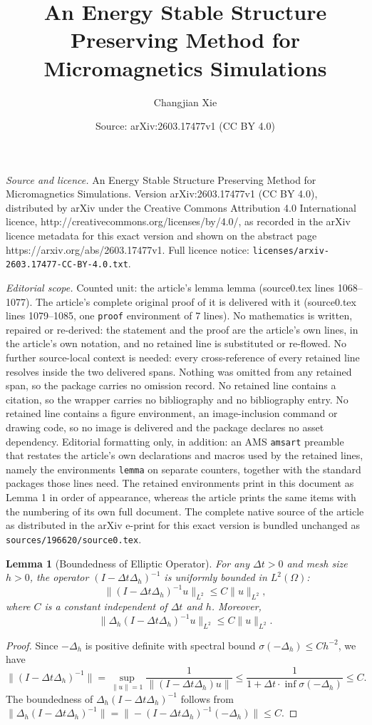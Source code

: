 \documentclass[10pt,a4paper]{amsart}
\title{An Energy Stable Structure Preserving Method for Micromagnetics Simulations}
\author{Changjian Xie}
\date{Source: arXiv:2603.17477v1 (CC BY 4.0)}
\newtheorem{lemma}{Lemma}
\begin{document}
\maketitle

\noindent\emph{Source and licence.} An Energy Stable Structure Preserving Method for Micromagnetics Simulations. Version arXiv:2603.17477v1 (CC BY 4.0), distributed by arXiv under the Creative Commons Attribution 4.0 International licence, http://creativecommons.org/licenses/by/4.0/, as recorded in the arXiv licence metadata for this exact version and shown on the abstract page https://arxiv.org/abs/2603.17477v1. Full licence notice: \texttt{licenses/arxiv-2603.17477-CC-BY-4.0.txt}.\par\smallskip

\noindent\textit{Editorial scope.} Counted unit: the article's lemma lemma (source0.tex lines 1068--1077). The article's complete original proof of it is delivered with it (source0.tex lines 1079--1085, one \texttt{proof} environment of 7 lines). No mathematics is written, repaired or re-derived: the statement and the proof are the article's own lines, in the article's own notation, and no retained line is substituted or re-flowed.  No further source-local context is needed: every cross-reference of every retained line resolves inside the two delivered spans.  Nothing was omitted from any retained span, so the package carries no omission record.  No retained line contains a citation, so the wrapper carries no bibliography and no bibliography entry.  No retained line contains a figure environment, an image-inclusion command or drawing code, so no image is delivered and the package declares no asset dependency.  Editorial formatting only, in addition: an AMS \texttt{amsart} preamble that restates the article's own declarations and macros used by the retained lines, namely the environments \texttt{lemma} on separate counters, together with the standard packages those lines need.  The retained environments print in this document as Lemma 1 in order of appearance, whereas the article prints the same items with the numbering of its own full document.  The complete native source of the article as distributed in the arXiv e-print for this exact version is bundled unchanged as \texttt{sources/196620/source0.tex}.
\begin{lemma}[Boundedness of Elliptic Operator]
For any $\Delta t > 0$ and mesh size $h > 0$, the operator $(I - \Delta t \Delta_h)^{-1}$ is uniformly bounded in $L^2(\Omega)$:
\[
\|(I - \Delta t \Delta_h)^{-1} u\|_{L^2} \leq C \|u\|_{L^2},
\]
where $C$ is a constant independent of $\Delta t$ and $h$. Moreover,
\[
\|\Delta_h (I - \Delta t \Delta_h)^{-1} u\|_{L^2} \leq C \|u\|_{L^2}.
\]
\end{lemma}

\begin{proof}
Since $-\Delta_h$ is positive definite with spectral bound $\sigma(-\Delta_h) \leq C h^{-2}$, we have
\[
\|(I - \Delta t \Delta_h)^{-1}\| = \sup_{\|u\|=1} \frac{1}{\|(I - \Delta t \Delta_h)u\|} \leq \frac{1}{1 + \Delta t \cdot \inf\sigma(-\Delta_h)} \leq C.
\]
The boundedness of $\Delta_h (I - \Delta t \Delta_h)^{-1}$ follows from $\|\Delta_h (I - \Delta t \Delta_h)^{-1}\| = \|-(I - \Delta t \Delta_h)^{-1}(-\Delta_h)\| \leq C$.
\end{proof}
\end{document}
